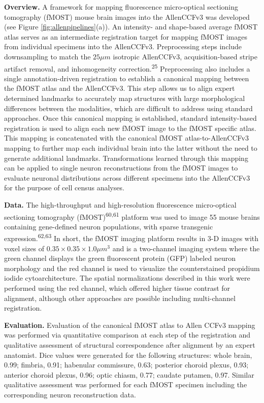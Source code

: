 \documentclass[
  12pt,
]{article}
\begin{document}
\textbf{Overview.} A framework for mapping fluorescence micro-optical
sectioning tomography (fMOST) mouse brain images into the AllenCCFv3 was
developed (see Figure \ref{fig:allenpipelines}(a)). An intensity- and
shape-based average fMOST atlas serves as an intermediate registration
target for mapping fMOST images from individual specimens into the
AllenCCFv3. Preprocessing steps include downsampling to match the
\(25 \mu m\) isotropic AllenCCFv3, acquisition-based stripe artifact
removal, and inhomogeneity correction.\textsuperscript{25} Preprocessing
also includes a single annotation-driven registration to establish a
canonical mapping between the fMOST atlas and the AllenCCFv3. This step
allows us to align expert determined landmarks to accurately map
structures with large morphological differences between the modalities,
which are difficult to address using standard approaches. Once this
canonical mapping is established, standard intensity-based registration
is used to align each new fMOST image to the fMOST specific atlas. This
mapping is concatenated with the canonical fMOST atlas-to-AllenCCFv3
mapping to further map each individual brain into the latter without the
need to generate additional landmarks. Transformations learned through
this mapping can be applied to single neuron reconstructions from the
fMOST images to evaluate neuronal distributions across different
specimens into the AllenCCFv3 for the purpose of cell census analyses.

\textbf{Data.} The high-throughput and high-resolution fluorescence
micro-optical sectioning tomography (fMOST)\textsuperscript{60,61}
platform was used to image 55 mouse brains containing gene-defined
neuron populations, with sparse transgenic
expression.\textsuperscript{62,63} In short, the fMOST imaging platform
results in 3-D images with voxel sizes of
\(0.35 \times 0.35 \times 1.0 \mu m^3\) and is a two-channel imaging
system where the green channel displays the green fluorescent protein
(GFP) labeled neuron morphology and the red channel is used to visualize
the counterstained propidium iodide cytoarchitecture. The spatial
normalizations described in this work were performed using the red
channel, which offered higher tissue contrast for alignment, although
other approaches are possible including multi-channel registration.

\textbf{Evaluation.} Evaluation of the canonical fMOST atlas to Allen
CCFv3 mapping was performed via quantitative comparison at each step of
the registration and qualitative assessment of structural correspondence
after alignment by an expert anatomist. Dice values were generated for
the following structures: whole brain, 0.99; fimbria, 0.91; habenular
commissure, 0.63; posterior choroid plexus, 0.93; anterior choroid
plexus, 0.96; optic chiasm, 0.77; caudate putamen, 0.97. Similar
qualitative assessment was performed for each fMOST specimen including
the corresponding neuron reconstruction data.
\end{document}
